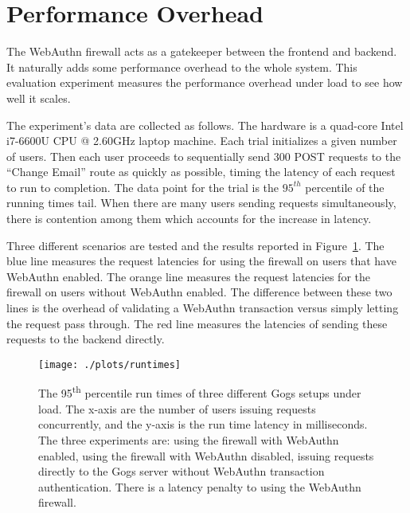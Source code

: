 
\section{Performance Overhead}

The WebAuthn firewall acts as a gatekeeper between the frontend and backend. It naturally adds some performance overhead to the whole system. This evaluation experiment measures the performance overhead under load to see how well it scales. 

The experiment's data are collected as follows. The hardware is a quad-core Intel i7-6600U CPU @ 2.60GHz laptop machine. Each trial initializes a given number of users. Then each user proceeds to sequentially send 300 POST requests to the ``Change Email'' route as quickly as possible, timing the latency of each request to run to completion. The data point for the trial is the $95^{th}$ percentile of the running times tail. When there are many users sending requests simultaneously, there is contention among them which accounts for the increase in latency.

Three different scenarios are tested and the results reported in Figure~\ref{Fig:PerformanceOverhead}. The blue line measures the request latencies for using the firewall on users that have WebAuthn enabled. The orange line measures the request latencies for the firewall on users without WebAuthn enabled. The difference between these two lines is the overhead of validating a WebAuthn transaction versus simply letting the request pass through. The red line measures the latencies of sending these requests to the backend directly.

\begin{figure}[h]
  \centering
  \texttt{[image: ./plots/runtimes]}
  \caption{The 95\textsuperscript{th} percentile run times of three different Gogs setups under load. The x-axis are the number of users issuing requests concurrently, and the y-axis is the run time latency in milliseconds. The three experiments are: using the firewall with WebAuthn enabled, using the firewall with WebAuthn disabled, issuing requests directly to the Gogs server without WebAuthn transaction authentication. There is a latency penalty to using the WebAuthn firewall.}
  \label{Fig:PerformanceOverhead}
\end{figure}

